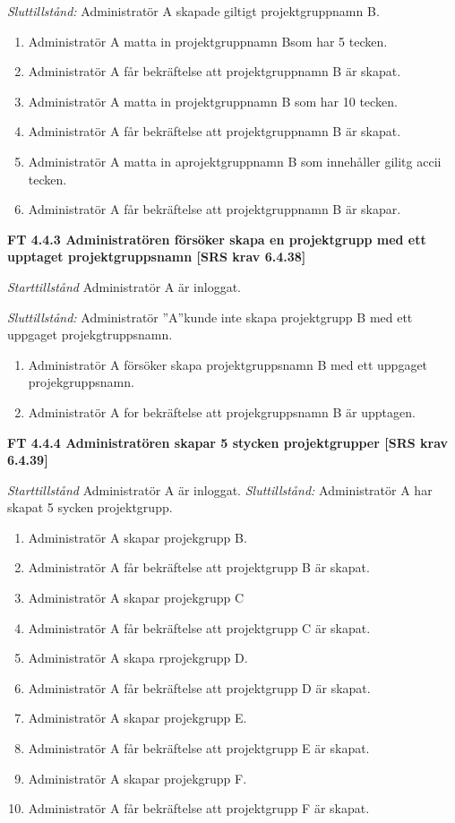 \documentclass[a4paper]{article}
\begin{document}
\emph{Sluttillstånd:} Administratör A  skapade  giltigt projektgruppnamn B.

\begin{enumerate}
\item Administratör A matta in projektgruppnamn Bsom har 5 tecken.
\item Administratör A får bekräftelse att projektgruppnamn B är skapat.
\item Administratör A matta in projektgruppnamn B som har 10 tecken.
\item Administratör A får bekräftelse att projektgruppnamn B är skapat.
\item Administratör A matta in aprojektgruppnamn B som innehåller gilitg accii tecken.
\item Administratör A får bekräftelse att projektgruppnamn B är skapar.
\end{enumerate}

\textbf{FT 4.4.3 Administratören försöker skapa en projektgrupp med ett upptaget projektgruppsnamn [SRS krav 6.4.38]}

\emph{Starttillstånd} Administratör A är inloggat.

\emph{Sluttillstånd:} Administratör ”A”kunde inte skapa  projektgrupp B med ett uppgaget projekgtruppsnamn.

\begin{enumerate}
\item Administratör A försöker skapa  projektgruppsnamn B med ett uppgaget projekgruppsnamn.
\item Administratör A for bekräftelse att projekgruppsnamn B är upptagen.
\end{enumerate}

\textbf{FT 4.4.4 Administratören skapar 5 stycken projektgrupper [SRS krav 6.4.39]}

\emph{Starttillstånd} Administratör A är inloggat. 
\emph{Sluttillstånd:} Administratör A har skapat 5 sycken projektgrupp.

\begin{enumerate}
\item Administratör A skapar projekgrupp B.
\item Administratör A får bekräftelse att projektgrupp B är skapat.
\item Administratör A skapar projekgrupp C
\item Administratör A får bekräftelse att projektgrupp C är skapat.
\item Administratör A skapa rprojekgrupp D.
\item Administratör A får bekräftelse att projektgrupp D är skapat.
\item Administratör A skapar projekgrupp E.
\item Administratör A får bekräftelse att projektgrupp E är skapat.
\item Administratör A skapar projekgrupp F.
\item Administratör A får bekräftelse att projektgrupp F är skapat.
\end{enumerate}
\end{document}
